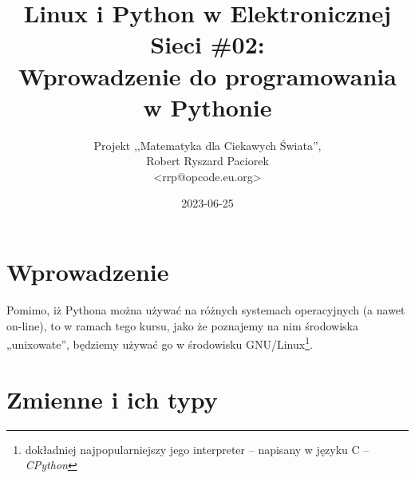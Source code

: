 \documentclass{pdfBooklets}
\title{Linux i Python w Elektronicznej Sieci \#02:\\ Wprowadzenie do programowania w Pythonie}
\author{%
	Projekt ,,Matematyka dla Ciekawych Świata'',\\
	Robert Ryszard Paciorek\\\normalsize\ttfamily <rrp@opcode.eu.org>
}
\date  {2023-06-25}
\begin{document}
\maketitle

\section{Wprowadzenie}



Pomimo, iż Pythona można używać na różnych systemach operacyjnych (a nawet on-line),
to w ramach tego kursu, jako że poznajemy na nim środowiska „unixowate”,
będziemy używać go w środowisku GNU/Linux\footnote{
	dokładniej najpopularniejszy jego interpreter – napisany w języku C – \textit{CPython}
}.






\section{Zmienne i ich typy}
	




\ZadaniaRozwiazaniaAuto[intro=booklets-sections/python/zadania-00-intro.tex]

\end{document}

